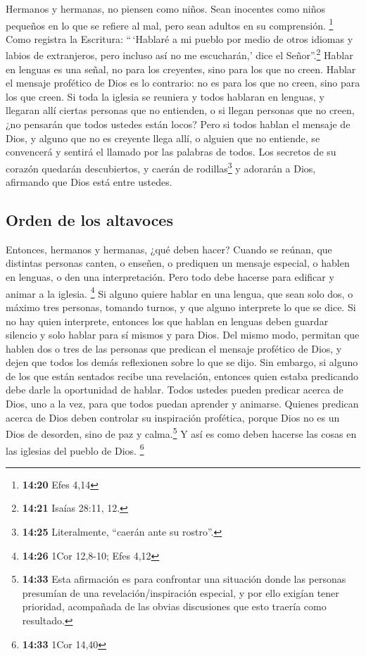  Hermanos y hermanas, no piensen como niños. Sean
inocentes como niños pequeños en lo que se refiere al mal, pero sean
adultos en su comprensión. \footnote{\textbf{14:20} Efes 4,14}
 Como registra la Escritura: ``\,`Hablaré a mi pueblo por
medio de otros idiomas y labios de extranjeros, pero incluso así no me
escucharán,' dice el Señor''.\footnote{\textbf{14:21} Isaías 28:11, 12.}
 Hablar en lenguas es una señal, no para los creyentes,
sino para los que no creen. Hablar el mensaje profético de Dios es lo
contrario: no es para los que no creen, sino para los que creen.
 Si toda la iglesia se reuniera y todos hablaran en
lenguas, y llegaran allí ciertas personas que no entienden, o si llegan
personas que no creen, ¿no pensarán que todos ustedes están locos?
 Pero si todos hablan el mensaje de Dios, y alguno que no
es creyente llega allí, o alguien que no entiende, se convencerá y
sentirá el llamado por las palabras de todos.  Los
secretos de su corazón quedarán descubiertos, y caerán de
rodillas\footnote{\textbf{14:25} Literalmente, ``caerán ante su
  rostro''.} y adorarán a Dios, afirmando que Dios está entre ustedes.

\hypertarget{orden-de-los-altavoces}{%
\subsection{Orden de los altavoces}\label{orden-de-los-altavoces}}

 Entonces, hermanos y hermanas, ¿qué deben hacer? Cuando
se reúnan, que distintas personas canten, o enseñen, o prediquen un
mensaje especial, o hablen en lenguas, o den una interpretación. Pero
todo debe hacerse para edificar y animar a la iglesia. \footnote{\textbf{14:26}
  1Cor 12,8-10; Efes 4,12}  Si alguno quiere hablar en
una lengua, que sean solo dos, o máximo tres personas, tomando turnos, y
que alguno interprete lo que se dice.  Si no hay quien
interprete, entonces los que hablan en lenguas deben guardar silencio y
solo hablar para sí mismos y para Dios.  Del mismo modo,
permitan que hablen dos o tres de las personas que predican el mensaje
profético de Dios, y dejen que todos los demás reflexionen sobre lo que
se dijo.  Sin embargo, si alguno de los que están
sentados recibe una revelación, entonces quien estaba predicando debe
darle la oportunidad de hablar.  Todos ustedes pueden
predicar acerca de Dios, uno a la vez, para que todos puedan aprender y
animarse.  Quienes predican acerca de Dios deben
controlar su inspiración profética,  porque Dios no es un
Dios de desorden, sino de paz y calma.\footnote{\textbf{14:33} Esta
  afirmación es para confrontar una situación donde las personas
  presumían de una revelación/inspiración especial, y por ello exigían
  tener prioridad, acompañada de las obvias discusiones que esto traería
  como resultado.} Y así es como deben hacerse las cosas en las iglesias
del pueblo de Dios. \footnote{\textbf{14:33} 1Cor 14,40}

